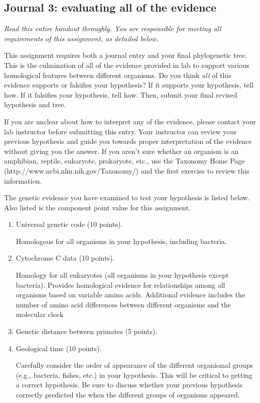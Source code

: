 \documentclass[12pt]{exam}
\begin{document}
\subsection*{Journal 3: evaluating all of the evidence}

\emph{Read this entire handout throughly. You are responsible for meeting all requirements of this assignment, as detailed below.}

This assignment requires both a journal entry and your final
phylogenetic tree. This is the culmination of all of the evidence 
provided in lab  to support various homological features between 
different organisms.  Do you think \emph{all} of this evidence supports 
or falsifies your hypothesis? If it supports your hypothesis, tell how. If it
falsifies your hypothesis, tell how. Then, submit your final revised
hypothesis and tree.

If you are unclear about how to interpret any of the evidence, please 
contact your lab instructor before submitting this entry. Your instructor can 
review your previous hypothesis and guide you towards proper interpretation of
the evidence without giving you the answer. If you aren't sure whether an organism is an amphibian, reptile,
eukaryote, prokaryote, etc., use the Taxonomy Home Page
(http://www.ncbi.nlm.nih.gov/Taxonomy/) and the first exercise to review
this information.

The genetic evidence you have examined to test 
your hypothesis is listed below.  Also listed is the component point value 
for this assignment.

\begin{enumerate}

\item Universal genetic code (10 points).

	Homologous for all organisms in your hypothesis, including bacteria.
  
\item Cytochrome C data (10 points). 

	Homology for all eukaryotes (all organisms in your hypothesis 
	except bacteria). Provides homological evidence for relationships 
	among all organisms based on variable amino acids.  Additional 
	evidence includes the number of amino acid differences between 
	different organisms and the molecular clock 

\item Genetic distance between primates (5 points).

\item Geological time (10 points).

	Carefully consider the order of appearance of the different organismal 
	groups (e.g., bacteria, fishes, etc.) in   your hypothesis. This will be 
	critical to getting a correct hypothesis. Be sure to discuss whether 
	your previous hypothesis  correctly predicted the when the 
	different groups of organisms appeared.

\end{enumerate}
\end{document}
